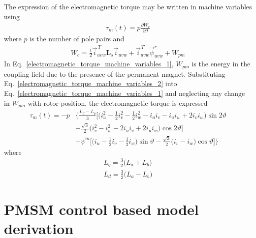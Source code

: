 \documentclass[12pt,a4paper]{scrartcl}
\begin{document}
\begin{onehalfspace}
The expression of the electromagnetic torque may be written in machine variables using
\begin{align}\label{electromagnetic_torque_machine_variables_1}
	\tau_m(t) = p\frac{\partial W_c}{\partial \vartheta}
\end{align}
where $p$ is the number of pole pairs and
\begin{align}\label{electromagnetic_torque_machine_variables_2}
	W_c = \frac{1}{2}\vec{i}_{uvw}^{\,T}\mathbf{L}_s\vec{i}_{uvw}+\vec{i}_{uvw}^{\,T}\vec{\psi}^r_{uvw}+W_{pm}
\end{align}
In Eq.~\ref{electromagnetic_torque_machine_variables_1}, $W_{pm}$ is the energy in the coupling field due to the presence of the permanent magnet. Substituting Eq.~\ref{electromagnetic_torque_machine_variables_2} into Eq.~\ref{electromagnetic_torque_machine_variables_1} and neglecting any change in $W_{pm}$ with rotor position, the electromagnetic torque is expressed
\begin{equation}\label{electromagnetic_torque_machine_variables_3}
	\begin{aligned}
		\tau_m(t) = -p&\Big\{\frac{L_d-L_q}{3}\Big[\Big(i_u^2-\frac{1}{2}i_v^2-\frac{1}{2}i_w^2 -i_ui_v-i_ui_w+2i_vi_w\Big)\sin2\vartheta \\[6pt]
		&+\frac{\sqrt{3}}{2}\big(i_v^2-i_w^2-2i_ui_v+2i_ui_w\big)\cos2\vartheta\Big] \\[6pt]
		&+ \psi^m\Big[\Big(i_u-\frac{1}{2}i_v-\frac{1}{2}i_w\Big)\sin\vartheta - \frac{\sqrt{3}}{2}\big(i_v-i_w\big)\cos\vartheta\Big]\Big\}
	\end{aligned}
\end{equation}
where 
\begin{align}
	L_q = \frac{3}{2}\Big(L_a+L_b\Big) \\[6pt]
	L_d = \frac{3}{2}\Big(L_a-L_b\Big)
\end{align}

\section{PMSM control based model derivation}

\end{onehalfspace}
\end{document}
